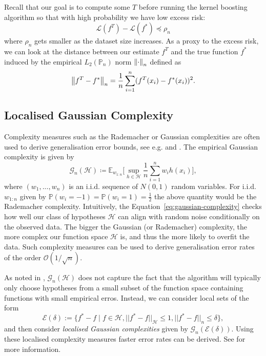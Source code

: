 Recall that our goal is to compute some $T$ before running the kernel boosting
algorithm so that with high probability we have low excess risk:
$$
\mathcal{L}(f^{T}) - \mathcal{L}(f^{*}) \preceq \rho_{n}
$$
where $\rho_{n}$ gets smaller as the dataset size increases.
As a proxy to the excess risk, we can look at the distance
between our estimate $f^{T}$ and the true function $f^{*}$ induced by the empirical
$L_{2}(\mathbb{P}_{n})$ norm $\left\lVert\cdot\right\rVert_{n}$ defined as
$$
\left\lVert f^{T} - f^{*}\right\rVert_{n} = \frac{1}{n} \sum_{i=1}^{n} (f^{T}(x_{i}) - f^{*}(x_{i}))^{2}.
$$

\subsection{Localised Gaussian Complexity}

Complexity measures such as the Rademacher or Gaussian complexities
are often used to derive generalisation error bounds, see e.g. \cite{bartlett2002rademacher}
and \cite{bartlett2005local}.
The empirical Gaussian complexity is given by
\begin{equation}
  \label{eq:gaussian-complexity}
  \mathcal{G}_{n}(\mathcal{H}) \coloneqq \mathbb{E}_{w_{1:n}}\Big[\sup_{h\in\mathcal{H}}\frac{1}{n}\sum_{i=1}^nw_ih(x_i)\Big],
\end{equation}
where $(w_1,...,w_n)$ is an i.i.d. sequence of $N(0,1)$ random variables.
For i.i.d. $w_{1:n}$ given by $\mathbb{P}(w_i=-1)=\mathbb{P}(w_i=1)=\frac{1}{2}$ the above quantity would
be the Rademacher complexity.
Intuitively, the Equation~\ref{eq:gaussian-complexity} checks how well our class
of hypotheses $\mathcal{H}$ can align with random noise conditionally on the observed data.
The bigger the Gaussian (or Rademacher) complexity, the more complex our function
space $\mathcal{H}$ is, and thus the more likely to overfit the data.
Such complexity measures can be used to derive generalisation error rates
of the order $\mathcal{O}(1/\sqrt{n})$.


As noted in \cite{bartlett2005local}, $\mathcal{G}_{n}(\mathcal{H})$ does not capture the fact
that the algorithm will typically only choose hypotheses from a small subset of the function space
containing functions with small empirical erros. Instead, we can consider local sets of the
form
$$
  \mathcal{E}(\delta):= \{f^{*}-f \mid f\in\mathcal{H}, ||f^{*}-f||_{\mathcal{H}}\le 1, ||f^{*}-f||_n \leq \delta\},
$$
and then consider \textit{localised Gaussian complexities} given by
$\mathcal{G}_{n}(\mathcal{E}(\delta))$. Using these localised complexity measures
faster error rates can be derived. See \citet{bartlett2005local} for more information.

